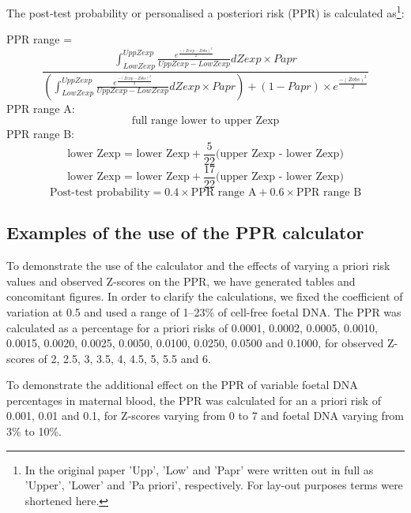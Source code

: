 The post-test probability or personalised a posteriori risk (PPR) is calculated as\footnote{In the original paper 'Upp', 'Low' and 'Papr' were written out in full as 'Upper', 'Lower' and 'Pa priori', respectively. For lay-out purposes terms were shortened here.}:

\vspace{2mm}
\textrm{PPR range} = 
\begin{equation*}
	\frac{\int^{Upp Zexp}_{Low Zexp}\frac{e^\frac{-(Zexp - Zobs)^2}{2}}{Upp Zexp - Low Zexp}dZexp \times Papr}{(\int^{Upp Zexp}_{Low Zexp}\frac{e^\frac{-(Zexp - Zobs)^2}{2}}{Upp Zexp - Low Zexp}dZexp \times Papr) + (1 - Papr) \times e^{\frac{-(Zobs)^2}{2}}}
\end{equation*}
\vspace{5mm}
PPR range A:
\begin{equation*}
	\textrm{full range lower to upper Zexp}
\end{equation*}
\vspace{2mm}
PPR range B: 
\begin{equation*}
	\textrm{lower Zexp = lower Zexp} + \frac{5}{22}\textrm{(upper Zexp - lower Zexp)}
\end{equation*}
\begin{equation*}
	\textrm{lower Zexp = lower Zexp} +\frac{17}{22}\textrm{(upper Zexp - lower Zexp)}
\end{equation*}
\vspace{1mm}
\begin{equation*}
	\textrm{Post-test probability} = 0.4 \times \textrm{PPR range A} + 0.6 \times \textrm{PPR range B}
\end{equation*}

\subsection{Examples of the use of the PPR calculator}
To demonstrate the use of the calculator and the effects of varying a priori risk values and observed Z-scores on the PPR, we have generated tables and concomitant figures. 
In order to clarify the calculations, we fixed the coefficient of variation at 0.5 and used a range of 1–23\% of cell-free foetal DNA. The PPR was calculated as a percentage for a priori risks of 0.0001, 0.0002, 0.0005, 0.0010, 0.0015, 0.0020, 0.0025, 0.0050, 0.0100, 0.0250, 0.0500 and 0.1000, for observed Z-scores of 2, 2.5, 3, 3.5, 4, 4.5, 5, 5.5 and 6.

To demonstrate the additional effect on the PPR of variable foetal DNA percentages in maternal blood, the PPR was calculated for an a priori risk of 0.001, 0.01 and 0.1, for Z-scores varying from 0 to 7 and foetal DNA varying from 3\% to 10\%.

